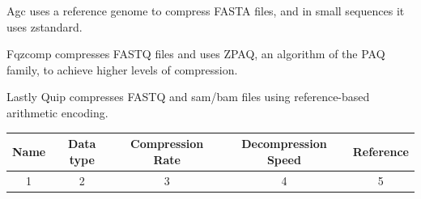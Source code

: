 Agc uses a reference genome to compress FASTA files, and in small sequences it uses zstandard.

Fqzcomp compresses FASTQ files and uses ZPAQ, an algorithm of the PAQ family, to achieve higher levels of compression.

Lastly Quip compresses FASTQ and \ac{sam}/\ac{bam} files using reference-based arithmetic encoding.

\begin{center}
    \begin{tabular}{|| c | c | c | c | c ||}
        \hline
        Name & Data type & Compression Rate & Decompression Speed & Reference \\
        \hline\hline
        1 & 2 & 3 & 4 & 5\\
        \hline
    \end{tabular}
\end{center}









